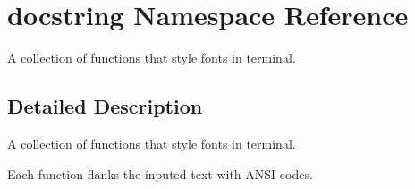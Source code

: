 \hypertarget{namespacedocstring}{}\section{docstring Namespace Reference}
\label{namespacedocstring}


A collection of functions that style fonts in terminal.  




\subsection{Detailed Description}
A collection of functions that style fonts in terminal. 

Each function flanks the inputed text with A\+N\+SI codes. 